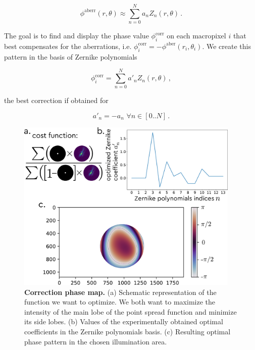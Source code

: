 \documentclass[12pt]{iopart}
\begin{document}
\begin{equation}
  \phi^\text{aberr}(r,\theta) \approx \sum_{n=0}^N a_n Z_n(r,\theta) \, .
\end{equation}

The goal is to find and display the phase value
$\phi_i^\text{corr}$ on each macropixel $i$ that best compensates for the aberrations,
i.e. $\phi_i^\text{corr} = -\phi^\text{aber}(r_i,\theta_i)$.
We create this pattern in the basis of Zernike polynomials

\begin{equation}
  \phi_i^\text{corr} = \sum_{n=0}^N a'_n Z_n(r,\theta) \, ,
\end{equation}

the best correction if obtained for


\begin{equation}
  a'_n = -a_n \,\, \forall n \in [0..N]\, .
\end{equation}

\begin{figure}
  \centering
  \includegraphics[width = 0.95\textwidth]{images/Zernike_1.pdf}
  \caption{
    \textbf{Correction phase map.}
    (a) Schematic representation of the function we want to optimize.
    We both want to maximize the intensity of the main lobe of the point spread function
    and minimize its side lobes.
    (b) Values of the experimentally obtained optimal coefficients in the Zernike polynomials basis.
    (c) Resulting optimal phase pattern in the chosen illumination area.
  }
  \label{fig:phase_corr}
\end{figure}
\end{document}
